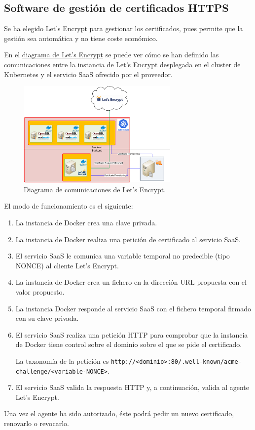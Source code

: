 \subsection{Software de gestión de certificados HTTPS}
\par Se ha elegido Let's Encrypt para gestionar los certificados, pues permite que la gestión sea automática y no tiene coste económico.
\par En el \hyperref[fig:Diagram_LetsEncypt_LLD]{diagrama de Let's Encrypt} se puede ver cómo se han definido las comunicaciones entre la instancia de Let's Encrypt desplegada en el cluster de Kubernetes y el servicio SaaS
ofrecido por el proveedor.
\begin{figure}[!ht]
  \centering
  \label{fig:Diagram_LetsEncypt_LLD}
  \includegraphics[width=0.7\textwidth]{fig/Diagram_LetsEncypt_LLD}
  \caption{Diagrama de comunicaciones de Let's Encrypt.}
\end{figure}
\par El modo de funcionamiento es el siguiente:
\begin{enumerate}
  \item La instancia de Docker crea una clave privada.
  \item La instancia de Docker realiza una petición de certificado al servicio SaaS.
  \item El servicio SaaS le comunica una variable temporal no predecible (tipo NONCE) al cliente Let's Encrypt.
  \item La instancia de Docker crea un fichero en la dirección URL propuesta con el valor propuesto.
  \item La instancia Docker responde al servicio SaaS con el fichero temporal firmado con su clave privada.
  \item El servicio SaaS realiza una petición HTTP para comprobar que la instancia de Docker tiene control sobre el dominio sobre el que se pide el certificado.
    \par La taxonomía de la petición es \lstinline{http://<dominio>:80/.well-known/acme-challenge/<variable-NONCE>}.
  \item El servicio SaaS valida la respuesta HTTP y, a continuación, valida al agente Let's Encrypt.
\end{enumerate}
\par Una vez el agente ha sido autorizado, éste podrá pedir un nuevo certificado, renovarlo o revocarlo.

